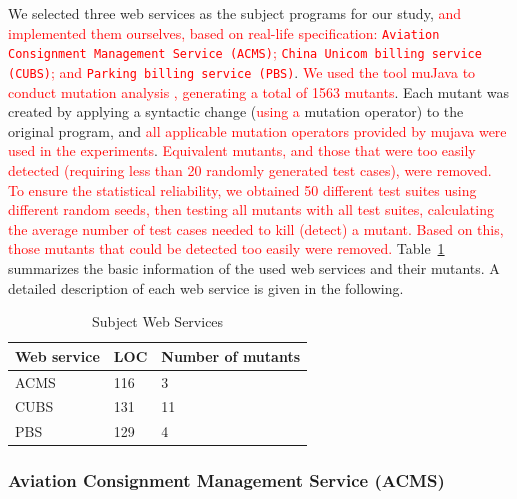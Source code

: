 \documentclass[10pt,journal,compsoc]{IEEEtran}
\begin{document}
We selected three web services as the subject programs for our study, \textcolor{red}{and implemented them ourselves, based on real-life specification:
\texttt{Aviation Consignment Management Service (ACMS)};
\texttt{China Unicom billing service (CUBS)}; and
\texttt{Parking billing service (PBS)}}. \textcolor{red}{
We used the tool muJava \cite{ma2005mujava} to conduct mutation analysis \cite{demillo1978hints, chen2018test, mao2017out, chen2017similarity}, generating a total of 1563 mutants}. Each mutant was created by applying a syntactic change (\textcolor{red}{using a} mutation operator) to the original program, and \textcolor{red}{all applicable mutation operators provided by mujava were used in the experiments}. \textcolor{red}{Equivalent mutants, and those that were too easily detected}
\textcolor{red}{(requiring less than 20 randomly generated test cases), were removed.}
\textcolor{red}{To ensure the statistical reliability, we obtained 50 different test suites using different random seeds, then testing all mutants with all test suites, calculating the average number of test cases needed to kill (detect) a mutant. Based on this, those mutants that could be detected too easily were removed.} Table~\ref{tab:objects} summarizes the basic information of the used web services and their mutants.
A detailed description of each web service is given in the following.

\begin{table}[h]
\caption{Subject Web Services}
\label{tab:objects}
\centering
\begin{tabular}{lll} \toprule
  Web service                            &LOC                            &Number of mutants    \\ \midrule
  ACMS                                   &116                            &3                                    \\
  CUBS                                   &131                            &11                                  \\
  PBS                                    &129                            &4                                   \\ \bottomrule
\end{tabular}

\end{table}

\subsubsection{Aviation Consignment Management Service (ACMS)}
\label{sec:acms}
\end{document}
